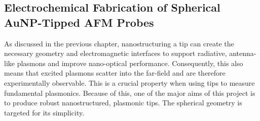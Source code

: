 \documentclass[12pt, a4paper, oneside]{book}
\begin{document}
\begin{singlespace}
\color{black}\chapter{Electrochemical Fabrication of Spherical AuNP-Tipped AFM Probes}
\end{singlespace}


As discussed in the previous chapter, nanostructuring a tip can create the necessary geometry and electromagnetic interfaces to support radiative, antenna-like plasmons and improve nano-optical performance. Consequently, this also means that excited plasmons scatter into the far-field and are therefore experimentally observable. This is a crucial property when using tips to measure fundamental plasmonics. Because of this, one of the major aims of this project is to produce robust nanostructured, plasmonic tips. The spherical geometry is targeted for its simplicity.
\end{document}
